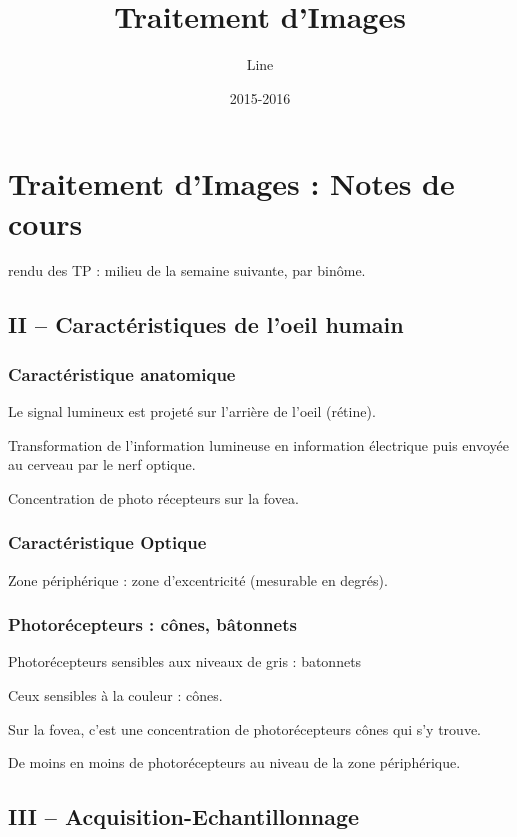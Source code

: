 \documentclass{report}
\title{Traitement d'Images}
\author{Line \bsc{POUVARET}}
\date{2015-2016}
\begin{document}
\maketitle

\chapter*{Traitement d'Images : Notes de cours}

rendu des TP : milieu de la semaine suivante, par binôme.

\section*{II – Caractéristiques de l'oeil humain}

\subsection*{Caractéristique anatomique}

Le signal lumineux est projeté sur l'arrière de l'oeil (rétine).

Transformation de l'information lumineuse en information électrique puis envoyée au cerveau par le nerf optique.

Concentration de photo récepteurs sur la fovea. 

\subsection*{Caractéristique Optique}

Zone périphérique : zone d'excentricité (mesurable en degrés).

\subsection*{Photorécepteurs : cônes, bâtonnets}

Photorécepteurs sensibles aux niveaux de gris : batonnets

Ceux sensibles à la couleur : cônes.

Sur la fovea, c'est une concentration de photorécepteurs cônes qui s'y trouve.

De moins en moins de photorécepteurs au niveau de la zone périphérique.

\section*{III – Acquisition-Echantillonnage}
\end{document}
